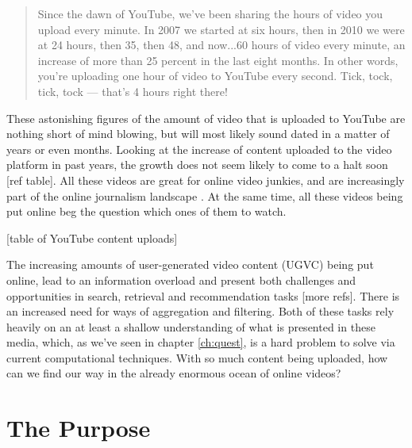 % 
% 
% 

\begin{quote}
  Since the dawn of YouTube, we’ve been sharing the hours of video you upload every minute. In 2007 we started at six hours, then in 2010 we were at 24 hours, then 35, then 48, and now...60 hours of video every minute, an increase of more than 25 percent in the last eight months. In other words, you’re uploading one hour of video to YouTube every second. Tick, tock, tick, tock — that’s 4 hours right there!
\end{quote}

These astonishing figures of the amount of video that is uploaded to YouTube are nothing short of mind blowing, but will most likely sound dated in a matter of years or even months. Looking at the increase of content uploaded to the video platform in past years, the growth does not seem likely to come to a halt soon [ref table]. All these videos are great for online video junkies, and are increasingly part of the online journalism landscape \cite{Rosenstiel:2012vb}. At the same time, all these videos being put online beg the question which ones of them to watch.

[table of YouTube content uploads]

The increasing amounts of user-generated video content (UGVC) being put online, lead to an information overload and present both challenges and opportunities in search, retrieval\cite{Ulges:2009ua} and recommendation\cite{Zhou:2010ut} tasks [more refs]. There is an increased need for ways of aggregation and filtering. Both of these tasks rely heavily on an at least a shallow understanding of what is presented in these media, which, as we've seen in chapter \ref{ch:quest}, is a hard problem to solve via current computational techniques. With so much content being uploaded, how can we find our way in the already enormous ocean of online videos?

\section{The Purpose}

